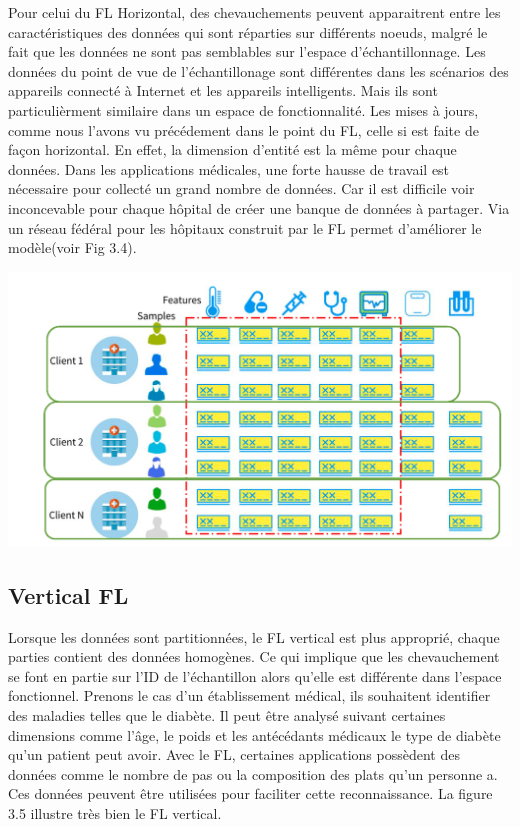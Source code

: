 \documentclass[12pt,a4paper]{report}
\begin{document}
Pour celui du FL Horizontal, des chevauchements peuvent apparaitrent entre les caractéristiques des données qui sont réparties sur différents noeuds, malgré le fait que les données ne sont pas semblables sur l'espace d'échantillonnage. Les données du point de vue de l'échantillonage sont différentes dans les scénarios des appareils connecté à Internet et les appareils intelligents. Mais ils sont particulièrment similaire dans un espace de fonctionnalité. Les mises à jours, comme nous l'avons vu précédement dans le point du FL, celle si est faite de façon horizontal. En effet, la dimension d'entité est la même pour chaque données. Dans les applications médicales, une forte hausse de travail est nécessaire pour collecté un grand nombre de données. Car il est difficile voir inconcevable pour chaque hôpital de créer une banque de données à partager. Via un réseau fédéral pour les hôpitaux construit par le FL permet d'améliorer le modèle(voir Fig 3.4).

\begin{center}
	\includegraphics[scale=0.2]{fl_horizontal}
	\label{fig1}
\end{center}


\subsection{Vertical FL}

Lorsque les données sont partitionnées, le FL vertical est plus approprié, chaque parties contient des données homogènes. Ce qui implique que les chevauchement se font en partie sur l'ID de l'échantillon alors qu'elle est différente dans l'espace fonctionnel. Prenons le cas d'un établissement médical, ils souhaitent identifier des maladies telles que le diabète. Il peut être analysé suivant certaines dimensions comme l'âge, le poids et les antécédants médicaux le type de diabète qu'un patient peut avoir. Avec le FL, certaines applications possèdent des données comme le nombre de pas ou la composition des plats qu'un personne a. Ces données peuvent être utilisées pour faciliter cette reconnaissance. La figure 3.5 illustre très bien le FL vertical.
\end{document}
